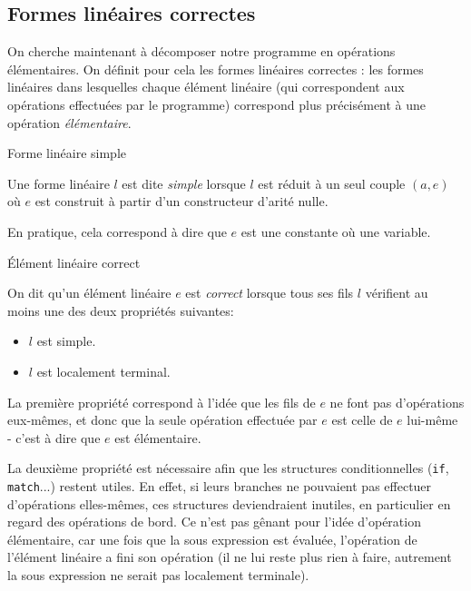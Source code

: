 \subsection{Formes linéaires correctes}

On cherche maintenant à décomposer notre programme en opérations élémentaires.
On définit pour cela les formes linéaires correctes : les formes linéaires dans
lesquelles chaque élément linéaire (qui correspondent aux opérations effectuées
par le programme) correspond plus précisément à une opération
\textit{élémentaire}.

\begin{definition}
    Forme linéaire simple

    Une forme linéaire $l$ est dite \textit{simple} lorsque $l$ est réduit à un
    seul couple $(a, e)$ où $e$ est construit à partir d'un constructeur d'arité
    nulle.
\end{definition}

\begin{remark}
    En pratique, cela correspond à dire que $e$ est une constante où une
    variable.
\end{remark}

\begin{definition}
    Élément linéaire correct

    On dit qu'un élément linéaire $e$ est \textit{correct} lorsque tous
    ses fils $l$ vérifient au moins une des deux propriétés suivantes:
    \begin{itemize}
        \item $l$ est simple.
        \item $l$ est localement terminal.
    \end{itemize}
\end{definition}

\begin{remark}
    La première propriété correspond à l'idée que les fils de $e$ ne font pas
    d'opérations eux-mêmes, et donc que la seule opération effectuée par $e$ est
    celle de $e$ lui-même - c'est à dire que $e$ est élémentaire.

    La deuxième propriété est nécessaire afin que les structures conditionnelles
    (\texttt{if}, \texttt{match}...) restent utiles. En effet, si leurs branches
    ne pouvaient pas effectuer d'opérations elles-mêmes, ces structures
    deviendraient inutiles, en particulier en regard des opérations de bord. Ce
    n'est pas gênant pour l'idée d'opération élémentaire, car une fois que la
    sous expression est évaluée, l'opération de l'élément linéaire a fini son
    opération (il ne lui reste plus rien à faire, autrement la sous expression
    ne serait pas localement terminale).
\end{remark}

